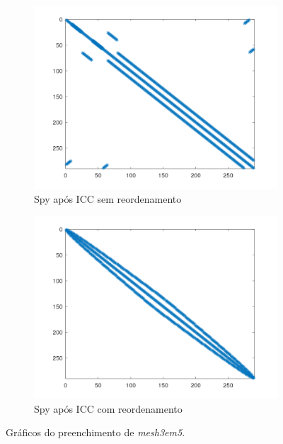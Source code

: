 \begin{figure}[H]
    \par\bigskip
    \begin{subfigure}[t]{0.4\linewidth}
         \centering
         \includegraphics[width=\textwidth]{images/mesh3em5_spyM_ICC_sem.png}
         \caption{Spy após ICC sem reordenamento}
         \label{fig:mesh-icc-s}
    \end{subfigure}
    \quad
    \begin{subfigure}[t]{0.4\linewidth}
         \centering
         \includegraphics[width=\textwidth]{images/mesh3em5_spyM_ICC_com.png}
         \caption{Spy após ICC com reordenamento}
         \label{fig:mesh-icc-c}
    \end{subfigure}
    \caption{Gráficos do preenchimento de \textit{mesh3em5}.}
    \label{fig:mesh}
\end{figure}